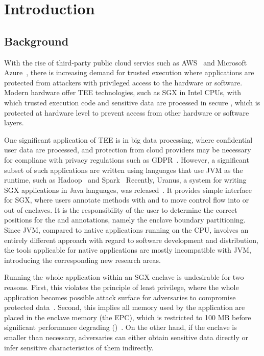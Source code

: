 \section{Introduction}\label{sec:introduction}

\subsection{Background}\label{subsec:background}
With the rise of third-party public cloud servics
such as AWS~\cite{aws} and Microsoft Azure~\cite{azure},
there is increasing demand for trusted execution where
applications are protected from
attackers with privileged access to the hardware or software.
Modern hardware offer \ac{TEE} technologies,
such as \ac{SGX} in Intel CPUs,
with which trusted execution code and sensitive data
are processed in secure ,
which is protected at hardware level to prevent access
from other hardware or software layers.

One significant application of \ac{TEE} is in big data processing,
where confidential user data are processed,
and protection from cloud providers may be necessary
for complianc with privacy regulations such as GDPR~\cite{gdpr}.
However, a significant subset of such applications are written
using languages that use \ac{JVM} as the runtime,
such as Hadoop~\cite{apachehadoop} and Spark~\cite{apachespark}
Recently, Uranus, a system for
writing \ac{SGX} applications in Java languages, was released~\cite{uranus}.
It provides simple interface for \ac{SGX},
where users annotate methods with  and 
to move control flow into or out of enclaves.
It is the responsibility of the user to determine the correct positions
for the  and  annotations,
namely the enclave boundary partitioning.
Since \ac{JVM}, compared to native applications running on the CPU,
involves an entirely different approach
with regard to software development and distribution,
the tools applicable for native applications are mostly incompatible with \ac{JVM},
introducing the corresponding new research areas.

Running the whole application within an \ac{SGX} enclave is undesirable for two reasons.
First, this violates the principle of least privilege,
where the whole application becomes possible attack surface
for adversaries to compromise protected data~\cite{glamdring}.
Second, this implies all memory used by the application
are placed in the enclave memory (the \ac{EPC}),
which is restricted to 100 MB before significant performance degrading
()~\cite{uranus}.
On the other hand, if the enclave is smaller than necessary,
adversaries can either obtain sensitive data directly or
infer sensitive characteristics of them indirectly.

